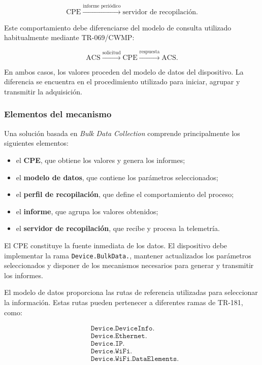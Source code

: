 \[
    \text{CPE}
    \xrightarrow{\text{informe periódico}}
    \text{servidor de recopilación}.
\]

Este comportamiento debe diferenciarse del modelo de consulta utilizado
habitualmente mediante TR-069/CWMP:

\[
    \text{ACS}
    \xrightarrow{\text{solicitud}}
    \text{CPE}
    \xrightarrow{\text{respuesta}}
    \text{ACS}.
\]

En ambos casos, los valores proceden del modelo de datos del dispositivo.
La diferencia se encuentra en el procedimiento utilizado para iniciar,
agrupar y transmitir la adquisición.


\subsubsection*{Elementos del mecanismo}

Una solución basada en \textit{Bulk Data Collection} comprende
principalmente los siguientes elementos:

\begin{itemize}
    \item el \textbf{CPE}, que obtiene los valores y genera los
    informes;

    \item el \textbf{modelo de datos}, que contiene los parámetros
    seleccionados;

    \item el \textbf{perfil de recopilación}, que define el
    comportamiento del proceso;

    \item el \textbf{informe}, que agrupa los valores obtenidos;

    \item el \textbf{servidor de recopilación}, que recibe y procesa la
    telemetría.
\end{itemize}

El CPE constituye la fuente inmediata de los datos. El dispositivo debe
implementar la rama \texttt{Device.BulkData.}, mantener actualizados los
parámetros seleccionados y disponer de los mecanismos necesarios para
generar y transmitir los informes.

El modelo de datos proporciona las rutas de referencia utilizadas para
seleccionar la información. Estas rutas pueden pertenecer a diferentes
ramas de TR-181, como:

\[
\begin{aligned}
    &\texttt{Device.DeviceInfo.}\\
    &\texttt{Device.Ethernet.}\\
    &\texttt{Device.IP.}\\
    &\texttt{Device.WiFi.}\\
    &\texttt{Device.WiFi.DataElements.}
\end{aligned}
\]

